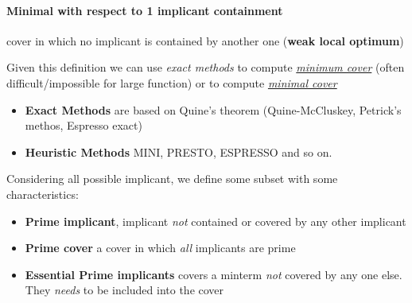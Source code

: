 \paragraph{Minimal with respect to 1 implicant containment} cover in which no implicant is contained by another one (\textbf{weak local optimum})

Given this definition we can use \textit{exact methods} to compute \textit{\underline{minimum cover}} (often difficult/impossible for large function) or \textit{\underline{}} to compute \textit{\underline{minimal cover}}

\begin{itemize}
	\item \textbf{Exact Methods} are based on Quine's theorem (Quine-McCluskey, Petrick's methos, Espresso exact)
	\item \textbf{Heuristic Methods} MINI, PRESTO, ESPRESSO and so on.
\end{itemize}
Considering all possible implicant, we define some subset with some characteristics:
\begin{itemize}
	\item \textbf{Prime implicant}, implicant \textit{not} contained or covered by any other implicant
	\item \textbf{Prime cover} a cover in which \textit{all} implicants are prime
	\item \textbf{Essential Prime implicants} covers a minterm \textit{not} covered by any one else. They \textit{needs} to be included into the cover 
\end{itemize}
